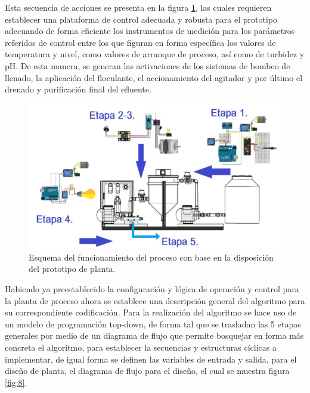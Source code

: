 \documentclass[conference]{IEEEtran}
\begin{document}
	Esta secuencia de acciones se presenta en la figura \ref{fig:7}, las cuales requieren establecer una plataforma de control adecuada y robusta para el prototipo adecuando de forma eficiente los instrumentos de medición para los parámetros referidos de control entre los que figuran en forma específica los valores de temperatura y nivel, como valores de arranque de proceso, así como de turbidez y pH\cite{b27}. De esta manera, se generan las activaciones de los sistemas de bombeo de llenado, la aplicación del floculante, el accionamiento del agitador y por último el drenado y purificación final del efluente.
	
	\begin{figure}[htbp]
		\centering
		\includegraphics[width=\columnwidth]{fig7.jpg}
		\caption{Esquema del funcionamiento del proceso con base en la disposición del prototipo de planta.}
		\label{fig:7}
	\end{figure}
	
	Habiendo ya preestablecido la configuración y lógica de operación y control para la planta de proceso ahora se establece una descripción general del algoritmo para su correspondiente codificación. Para la realización del algoritmo se hace uso de un modelo de programación top-down, de forma tal que se trasladan las 5 etapas generales por medio de un diagrama de flujo que permite bosquejar en forma más concreta el algoritmo, para establecer la secuencias y estructuras cíclicas a implementar, de igual forma se definen las variables de entrada y salida, para el diseño de planta, el diagrama de flujo para el diseño, el cual se muestra figura \ref{fig:8}.
	
\end{document}
